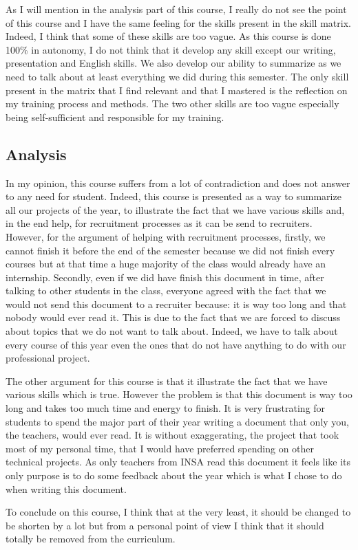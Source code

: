 As I will mention in the analysis part of this course, I really do not see the point of this course and I have the same feeling for the skills present in the skill matrix. Indeed, I think that some of these skills are too vague. As this course is done 100\% in autonomy, I do not think that it develop any skill except our writing, presentation and English skills. We also develop our ability to summarize as we need to talk about at least everything we did during this semester. The only skill present in the matrix that I find relevant and that I mastered is the reflection on my training process and methods. The two other skills are too vague especially being self-sufficient and responsible for my training. 

\subsection{Analysis}

In my opinion, this course suffers from a lot of contradiction and does not answer to any need for student. Indeed, this course is presented as a way to summarize all our projects of the year, to illustrate the fact that we have various skills and, in the end help, for recruitment processes as it can be send to recruiters. However, for the argument of helping with recruitment processes, firstly, we cannot finish it before the end of the semester because we did not finish every courses but at that time a huge majority of the class would already have an internship. Secondly, even if we did have finish this document in time, after talking to other students in the class, everyone agreed with the fact that we would not send this document to a recruiter because: it is way too long and that nobody would ever read it. This is due to the fact that we are forced to discuss about topics that we do not want to talk about. Indeed, we have to talk about every course of this year even the ones that do not have anything to do with our professional project. 
\\\par
The other argument for this course is that it illustrate the fact that we have various skills which is true. However the problem is that this document is way too long and takes too much time and energy to finish. It is very frustrating for students to spend the major part of their year writing a document that only you, the teachers, would ever read. It is without exaggerating, the project that took most of my personal time, that I would have preferred spending on other technical projects. 
As only teachers from INSA read this document it feels like its only  purpose is to do some feedback about the year which is what I chose to do when writing this document. 
\\\par
To conclude on this course, I think that at the very least, it should be changed to be shorten by a lot but from a personal point of view I think that it should totally be removed from the curriculum.